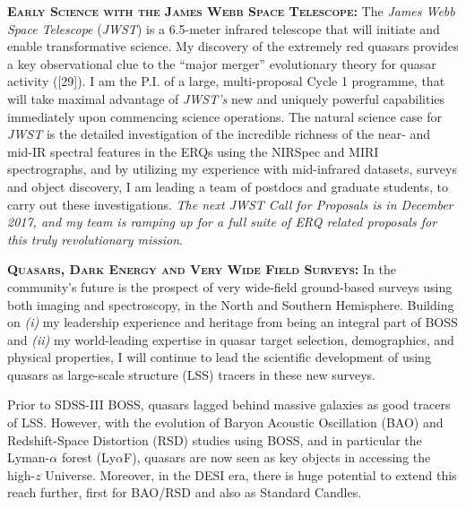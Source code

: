 \documentclass[oneside, a4paper, onecolumn, 11pt]{article}
\begin{document}
\smallskip \smallskip
\smallskip \smallskip
\noindent
\textbf{\textsc{Early Science with the James Webb Space Telescope: }}
The {\it James Webb Space Telescope} ({\it JWST}) is a 6.5-meter
infrared telescope that will initiate and enable transformative
science. My discovery of the extremely red quasars provides a key
observational clue to the ``major merger'' evolutionary theory for
quasar activity ([29]). I am the P.I. of a large, multi-proposal Cycle 1
programme, that will take maximal advantage of {\it JWST's} new and
uniquely powerful capabilities immediately upon commencing science
operations. The natural science case for {\it JWST} is the detailed
investigation of the incredible richness of the near- and mid-IR spectral
features in the ERQs using the NIRSpec and MIRI spectrographs, and by
utilizing my experience with mid-infrared datasets, surveys and object
discovery, I am leading a team of postdocs and graduate students, to
carry out these investigations. {\it The next JWST Call for Proposals
is in December 2017, and my team is ramping up for a full suite of ERQ
related proposals for this truly revolutionary mission}.


\smallskip
\smallskip
\noindent
\textbf{\textsc{Quasars, Dark Energy and Very Wide Field Surveys: }}
In the community's future is the prospect of very wide-field
ground-based surveys using both imaging and spectroscopy, in the North
and Southern Hemisphere. Building on {\it (i)} my leadership
experience and heritage from being an integral part of BOSS and {\it
(ii)} my world-leading expertise in quasar target selection,
demographics, and physical properties, I will continue to lead the
scientific development of using quasars as large-scale structure (LSS)
tracers in these new surveys.

\smallskip \smallskip
\noindent 
Prior to SDSS-III BOSS, quasars lagged behind massive galaxies as good
tracers of LSS. However, with the evolution of Baryon Acoustic
Oscillation (BAO) and Redshift-Space Distortion (RSD) studies using
BOSS, and in particular the Lyman-$\alpha$ forest (Ly$\alpha$F),
quasars are now seen as key objects in accessing the high-$z$
Universe. Moreover, in the DESI era, there is huge potential to extend
this reach further, first for BAO/RSD and also as Standard Candles. 
\end{document}
